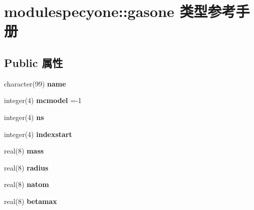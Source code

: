 \hypertarget{structmodulespecyone_1_1gasone}{}\section{modulespecyone\+::gasone 类型参考手册}
\label{structmodulespecyone_1_1gasone}
\subsection*{Public 属性}
\begin{DoxyCompactItemize}
\item 
\mbox{\label{structmodulespecyone_1_1gasone_a3e0c5e55d712891336e7c62b2659d1a0}} 
character(99) {\bfseries name}
\item 
\mbox{\label{structmodulespecyone_1_1gasone_ab38d2c93d8e4b28b0f6afb901bbf73e7}} 
integer(4) {\bfseries mcmodel} =-\/1
\item 
\mbox{\label{structmodulespecyone_1_1gasone_a340ff4a7532e56ebce42cc4705348e34}} 
integer(4) {\bfseries ns}
\item 
\mbox{\label{structmodulespecyone_1_1gasone_af7b0a5fa1e93be5c0338cb6f7b799f9e}} 
integer(4) {\bfseries indexstart}
\item 
\mbox{\label{structmodulespecyone_1_1gasone_ab4da70ae1b198df2dcd987947a02e4b1}} 
real(8) {\bfseries mass}
\item 
\mbox{\label{structmodulespecyone_1_1gasone_afac8093ebf5d39ed4c303c2e84414612}} 
real(8) {\bfseries radius}
\item 
\mbox{\label{structmodulespecyone_1_1gasone_a13eaaac619ef5bc8f22ab61dadb8c145}} 
real(8) {\bfseries natom}
\item 
\mbox{\label{structmodulespecyone_1_1gasone_a83bea04d564b3a629069524023d6e87c}} 
real(8) {\bfseries betamax}
\item 
\mbox{\label{structmodulespecyone_1_1gasone_ae7d4f982837ef141075d9f0e9806bb7c}} 

\end{DoxyCompactItemize}
